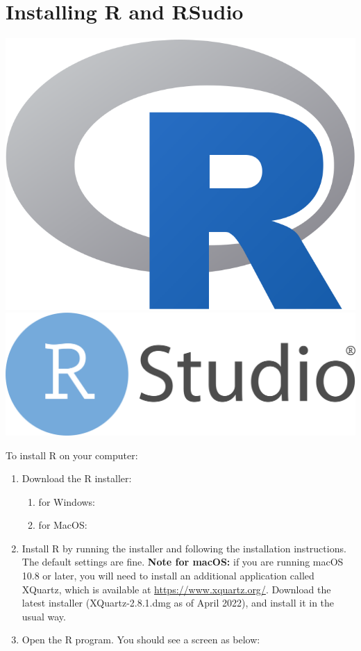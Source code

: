 \documentclass[
]{memoir}
\providecommand{\tightlist}{%
  \setlength{\itemsep}{0pt}\setlength{\parskip}{0pt}}
\begin{document}
\hypertarget{installing-r-and-rsudio}{%
\section{Installing R and RSudio}\label{installing-r-and-rsudio}}

\includegraphics[width=0.8\linewidth]{img/Rlogo} \includegraphics[width=0.8\linewidth]{img/RStudio-logo-flat}

To install R on your computer:

\begin{enumerate}
\def\labelenumi{\arabic{enumi}.}
\tightlist
\item
  Download the R installer:

  \begin{enumerate}
  \def\labelenumii{\alph{enumii}.}
  \tightlist
  \item
    for Windows:
  \item
    for MacOS:
  \end{enumerate}
\item
  Install R by running the installer and following the installation instructions. The default settings are fine.
  \textbf{Note for macOS:} if you are running macOS 10.8 or later, you will need to install an additional application called XQuartz, which is available at \url{https://www.xquartz.org/}. Download the latest installer (XQuartz-2.8.1.dmg as of April 2022), and install it in the usual way.
\item
  Open the R program. You should see a screen as below:
\end{enumerate}
\end{document}
